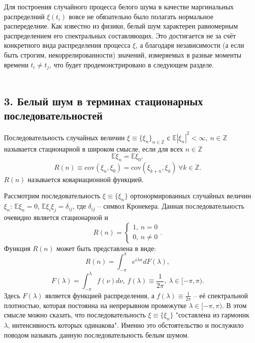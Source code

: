 \begin{remark} Для построения случайного процесса белого шума в качестве маргинальных распределний
$\xi(t_i)$ вовсе не обязательно было полагать нормальное распеределние. Как известно из физики, белый шум характерен
равномерным распределением его спектральных составляющих. Это достигается не за счёт конкретного вида распределения
процесса $\xi$, а благодаря независимости (а если быть строгим, некоррелированности) значений,
измеряемых в разные моменты времени $t_i \neq t_j$, что будет продемонстрировано в следующем разделе. \\\\
\end{remark}


\subsection*{3. Белый шум в терминах стационарных последовательностей}

\begin{definition} Последовательность случайных величин $\xi \equiv \{ \xi_n \}_{n \in \mathbb{Z}}$
с $\mathbb{E}|\xi_n|^2 < \infty ,~ n \in \mathbb{Z}$ называется стационарной в широком смысле,
если для всех $n \in \mathbb{Z}$
$$ \mathbb{E}\xi_n = \mathbb{E}\xi_0 ,$$
$$ R(n) \equiv \mathrm{cov}(\xi_n, \xi_0) = \mathrm{cov}(\xi_{k+n}, \xi_k) ~ \forall k \in \mathbb{Z} .$$
$R(n)$ называется ковариационной функцией. \cite{ShiryaevVeroyatnost1980} \\
\end{definition}

Рассмотрим последовательность $\xi \equiv \{ \xi_n \}$ ортонормированных случайных величин $\xi_n$:
${\mathbb{E}\xi_n = 0}$, $\mathbb{E}\xi_i\xi_j = \delta_{ij}$, где $\delta_{ij}$ -- символ Кронекера.
Данная последовательность очевидно является стационарной и
$$ R(n) = \begin{cases} 1 ,~ n = 0 \\ 0 ,~ n \neq 0 \end{cases} .$$
Функция $R(n)$ может быть представлена в виде:
$$ R(n) = \int_{-\pi}^{\pi} e^{i \lambda n} dF(\lambda) ,$$
$$ F(\lambda) = \int_{-\pi}^{\lambda} f(\nu) d\nu ,~ f(\lambda) \equiv \frac{1}{2\pi} ,~ \lambda \in [ -\pi, \pi ) .$$
Здесь $F(\lambda)$ является функцией распределения,
а $f(\lambda) \equiv \displaystyle\frac{1}{2\pi}$ -- её спектральной плотностью,
которая постоянна на непрерывном промежутке $\lambda \in [ -\pi, \pi )$.
В этом смысле можно сказать, что последовательность $\xi \equiv \{ \xi_n \}$
"составлена из гармоник $\lambda$, интенсивность которых одинакова".
Именно это обстоятельство и послужило поводом называть данную последовательность белым шумом.

